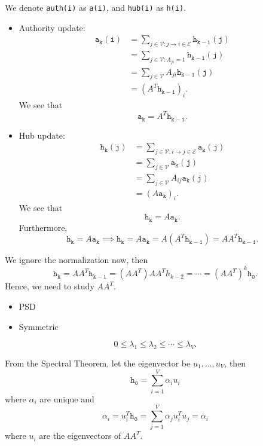 \begin{notation}
	We denote \texttt{auth(i)} as \texttt{a(i)}, and \texttt{hub(i)} as \texttt{h(i)}.
\end{notation}

\begin{itemize}
	\item Authority update:\[
		      \begin{split}
			      \mathtt{a_k(i)} & = \sum\limits_{j\in \mathcal{V}: j\to i\in \mathcal{E}}\mathtt{h_{k-1}(j)}\\
			      &=\sum\limits_{j\in\mathcal{V}\colon A_{ji} = 1}\mathtt{h_{k-1}(j)}\\
			      &=\sum\limits_{j\in\mathcal{V}}A_{ji}\mathtt{h_{k-1}(j)}\\
			      &= \left(A^{T} \mathtt{h_{k-1}}\right)_i.
		      \end{split}
	      \]
	      We see that
	      \[
		      \mathtt{a_k} = A^{T}\mathtt{h_{k-1}}.
	      \]
	\item Hub update:\[
		      \begin{split}
			      \mathtt{h_k(j)} &= \sum\limits_{j\in\mathcal{V}: i\to j\in\mathcal{E}} \mathtt{a_k(j)}\\
			      &= \sum\limits_{j\in\mathcal{V}} \mathtt{a_k(j)}\\
			      &= \sum\limits_{j\in\mathcal{V} }A_{ij}\mathtt{a_k(j)}\\
			      &= \left(A\mathtt{a_k}\right)_i.
		      \end{split}
	      \]
	      We see that
	      \[
		      \mathtt{h_{k}} = A \mathtt{a_{k}}.
	      \]
	      Furthermore,
	      \[
		      \mathtt{h_k} = A\mathtt{a_k}\implies \mathtt{h_k}= A\mathtt{a_k} = A(A^{T}\mathtt{h_{k-1}}) = A A^{T} \mathtt{h_{k-1}}.
	      \]
\end{itemize}
We ignore the normalization now, then
\[
	\mathtt{h_k} = A A^{T}\mathtt{h_{k-1}} = (A A^{T})A A^{T} h_{k-2} = \cdots = (A A^{T})^k \mathtt{h_0}.
\]
Hence, we need to study \(A A^{T}\).
\begin{itemize}
	\item PSD
	\item Symmetric
\end{itemize}
\[
	0 \leq \lambda_1 \leq \lambda_2 \leq \cdots \leq \lambda_V.
\]

From the Spectral Theorem, let the eigenvector be \(u_1, \ldots , u_V\), then
\[
	\mathtt{h_0} = \sum\limits_{i=1}^{V} \alpha_i u_{i}
\]
where \(\alpha_{i}\) are unique and
\[
	\alpha_{i} = u_{i}^{T}\mathtt{h_0} = \sum\limits_{j=1}^{V} \alpha_{j}u_{i}^{T}u_{j} = \alpha_{i}
\]
where \(u_{i}\) are the eigenvectors of \(A A^{T}\).

